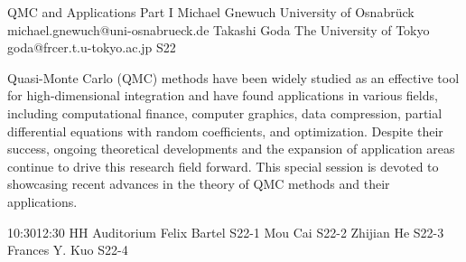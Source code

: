 \documentclass[12pt,lettersize,oneside]{book} %
\begin{document}
\clearpage

\begin{session}
 {QMC and Applications Part I}%
 {Michael Gnewuch}%
 {University of Osnabr\"uck}%
 {michael.gnewuch@uni-osnabrueck.de}%
 {Takashi Goda}%
 {The University of Tokyo}%
 {goda@frcer.t.u-tokyo.ac.jp}%
 {S22}%
 {}%

 Quasi-Monte Carlo (QMC) methods have been widely studied as an effective tool for high-dimensional integration and have found applications in various fields, including computational finance, computer graphics, data compression, partial differential equations with random coefficients, and %
 optimization.
 Despite their success, ongoing theoretical developments and the expansion of application areas continue to drive this research field forward. This special session is devoted to showcasing recent advances in the theory of QMC methods and their applications.
\end{session}



\sessionPart{}%
{\hfill{}
{10:30}{12:30} %
{HH Auditorium}} %
{Felix Bartel}
{S22-1}
{Mou Cai}
{S22-2}
{Zhijian He}
{S22-3}
{Frances Y. Kuo}
{S22-4}



\clearpage
\end{document}
